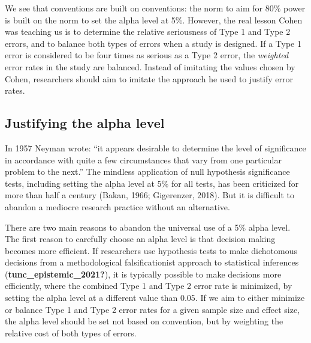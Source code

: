 \documentclass[
  english,
  ,jou, a4paper,floatsintext]{apa6}
\begin{document}
We see that conventions are built on conventions: the norm to aim for 80\% power is built on the norm to set the alpha level at 5\%. However, the real lesson Cohen was teaching us is to determine the relative seriousness of Type 1 and Type 2 errors, and to balance both types of errors when a study is designed. If a Type 1 error is considered to be four times as serious as a Type 2 error, the \emph{weighted} error rates in the study are balanced. Instead of imitating the values chosen by Cohen, researchers should aim to imitate the approach he used to justify error rates.

\hypertarget{justifying-the-alpha-level}{%
\subsection{Justifying the alpha level}\label{justifying-the-alpha-level}}

In 1957 Neyman wrote: ``it appears desirable to determine the level of significance in accordance with quite a few circumstances that vary from one particular problem to the next.'' The mindless application of null hypothesis significance tests, including setting the alpha level at 5\% for all tests, has been criticized for more than half a century (Bakan, 1966; Gigerenzer, 2018). But it is difficult to abandon a mediocre research practice without an alternative.

There are two main reasons to abandon the universal use of a 5\% alpha level. The first reason to carefully choose an alpha level is that decision making becomes more efficient. If researchers use hypothesis tests to make dichotomous decisions from a methodological falsificationist approach to statistical inferences (\textbf{tunc\_epistemic\_2021?}), it is typically possible to make decisions more efficiently, where the combined Type 1 and Type 2 error rate is minimized, by setting the alpha level at a different value than 0.05. If we aim to either minimize or balance Type 1 and Type 2 error rates for a given sample size and effect size, the alpha level should be set not based on convention, but by weighting the relative cost of both types of errors.
\end{document}
